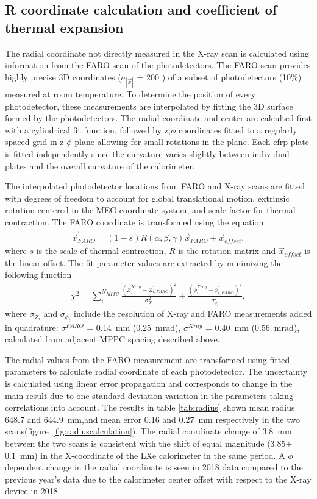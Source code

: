 \subsection {R coordinate calculation and 
coefficient of thermal expansion}
The radial coordinate not directly measured in the X-ray scan is
calculated using information from the FARO scan of the photodetectors.
The FARO scan provides highly precise 3D coordinates
($\sigma_{|\vec{x}|}$ = 200 \micron) of a subset of photodetectors
(10\%) measured at room temperature. To determine the position of
every photodetector, these measurements are interpolated by fitting
the 3D surface formed by the photodetectors. The radial coordinate and
center are calculted first with a cylindrical fit function, followed
by z,$\phi$ coordinates fitted to a regularly spaced grid in z-$\phi$
plane allowing for small rotations in the plane.  Each cfrp plate is
fitted independently since the curvature varies slightly between
individual plates and the overall curvature of the calorimeter.  


The interpolated photodetector locations from FARO
and X-ray scans are fitted with degrees of freedom to account for
global translational motion, extrinsic rotation centered in the MEG
coordinate  system, and scale factor for thermal contraction. 
The FARO coordinate is transformed using the equation
\begin{align}
\vec{x}_{FARO}^{'} = (1-s)R(\alpha,\beta,\gamma)\vec{x}_{FARO} +
\vec{x}_{offset},  
\end{align}
where $s$ is the scale of thermal contraction, $R$ is the rotation
matrix  and $\vec{x}_{offset}$ is the linear offset. 
The fit parameter values are extracted by minimizing the following function
\begin {align}
\chi^2 = 
\sum\limits_{i}^{N_{MPPC}} \frac{(Z_{i}^{Xray}-Z_{i,FARO}^{'})^2}{\sigma_{Z_{i}}^2} 
+ 
\frac{(\phi_{i}^{Xray}-\phi_{i,FARO}^{'})^2}{\sigma_{\phi_i}^2},
\end{align}
where $\sigma_{Z_i}$ and $\sigma_{\phi_i}$ include the resolution
of X-ray and FARO measurements
added in quadrature: 
$\sigma^{FARO}$ = 0.14~mm (0.25~mrad), 
$\sigma^{Xray}$ = 0.40~mm (0.56~mrad),
calculated from adjacent MPPC spacing described above.


The radial values from the FARO measurement are transformed using
fitted parameters to calculate radial coordinate of each
photodetector.  The uncertainty is calculated using linear error
propagation and corresponds to change in the main result due to one
standard deviation variation in the parameters taking correlations
into account.  The results in table \ref{tab:radius} shown mean radius
648.7 and 644.9~mm,and mean error 0.16 and 0.27~mm respectively in the
two scans(figure~\ref{fig:radiuscalculation}).  The radial coordinate
change of 3.8~mm between the two scans is consistent with the shift of
equal magnitude (3.85$\pm$0.1~mm) in the X-coordinate of the LXe
calorimeter in the same period.  A $\phi$ dependent change in the
radial coordinate is seen in 2018 data compared to the previous year's
data due to the calorimeter center offset with respect to the X-ray
device in 2018.



